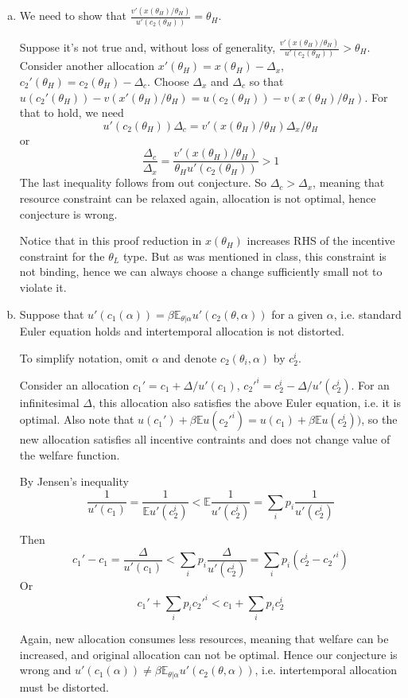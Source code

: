 \documentclass{article}
\newcommand{\E}{\mathbb{E}}
\begin{document}
\begin{enumerate}[(a)]
\item We need to show that
  $\frac{v'(x(\theta_H)/\theta_H)}{u'(c_2(\theta_H))} = \theta_H$.

  Suppose it's not true and, without loss of generality,
  $\frac{v'(x(\theta_H)/\theta_H)}{u'(c_2(\theta_H))} > \theta_H$.
  Consider another allocation $x'(\theta_H)=x(\theta_H)-\Delta_x$,
  $c_2'(\theta_H)=c_2(\theta_H)-\Delta_c$. Choose $\Delta_x$ and
  $\Delta_c$ so that
  $u(c_2'(\theta_H))-v(x'(\theta_H)/\theta_H)=u(c_2(\theta_H))-v(x(\theta_H)/\theta_H)$. For
  that to hold, we need
  $$u'(c_2(\theta_H))\Delta_c=v'(x(\theta_H)/\theta_H)\Delta_x/\theta_H$$
  or
  $$\frac{\Delta_c}{\Delta_x} = \frac{v'(x(\theta_H)/\theta_H)}{\theta_Hu'(c_2(\theta_H))}>1$$
  The last inequality follows from out conjecture. So
  $\Delta_c>\Delta_x$, meaning that resource constraint can be relaxed
  again, allocation is not optimal, hence conjecture is wrong.

  Notice that in this proof reduction in $x(\theta_H)$ increases RHS
  of the incentive constraint for the $\theta_L$ type. But as was
  mentioned in class, this constraint is not binding, hence we can
  always choose a change sufficiently small not to violate it.

\item Suppose that
  $u'(c_1(\alpha)) = \beta \E_{\theta|\alpha}u'(c_2(\theta,\alpha))$
  for a given $\alpha$, i.e. standard Euler equation holds and
  intertemporal allocation is not distorted.

  To simplify notation, omit $\alpha$ and denote
  $c_2(\theta_i,\alpha)$ by $c_2^i$.

  Consider an allocation $c_1' = c_1 + \Delta/u'(c_1)$,
  $c_2'^i = c_2^i - \Delta/u'(c_2^i)$. For an infinitesimal $\Delta$,
  this allocation also satisfies the above Euler equation, i.e. it is
  optimal. Also note that
  $u(c_1') + \beta\E u(c_2'^i) = u(c_1) + \beta \E u(c_2^i))$, so the
  new allocation satisfies all incentive contraints and does not
  change value of the welfare function.

  By Jensen's inequality
  $$\frac{1}{u'(c_1)}=\frac{1}{\E u'(c_2^i)} < \E \frac{1}{u'(c_2^i)}=\sum_i p_i\frac{1}{u'(c_2^i)}$$

  Then
  $$c_1'-c_1 = \frac{\Delta}{u'(c_1)} < \sum_i p_i\frac{\Delta}{u'(c_2^i)}=\sum_ip_i(c_2^i-c_2'^i)$$
  Or
  $$c_1'+\sum_ip_ic_2'^i < c_1+\sum_i p_i c_2^i$$

  Again, new allocation consumes less resources, meaning that welfare
  can be increased, and original allocation can not be optimal. Hence
  our conjecture is wrong and
  $u'(c_1(\alpha)) \ne \beta
  \E_{\theta|\alpha}u'(c_2(\theta,\alpha))$,
  i.e. intertemporal allocation must be distorted.

\end{enumerate}
\end{document}
